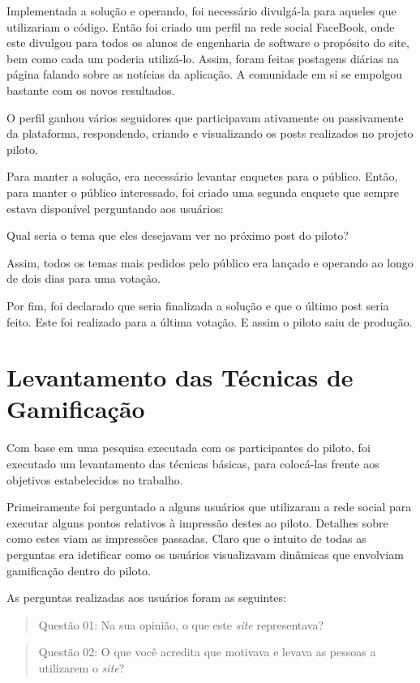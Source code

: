 Implementada a solução e operando, foi necessário divulgá-la para aqueles que utilizariam o código.
Então foi criado um perfil na rede social FaceBook, onde este divulgou para todos os alunos de engenharia
de software o propósito do site, bem como cada um poderia utilizá-lo. Assim, foram feitas postagens diárias
na página falando sobre as notícias da aplicação. A comunidade em si se empolgou bastante com os novos resultados.

O perfil ganhou vários seguidores que participavam ativamente ou passivamente da plataforma, respondendo, criando e
visualizando os posts realizados no projeto piloto.

Para manter a solução, era necessário levantar enquetes para o público. Então, para manter o público interessado,
foi criado uma segunda enquete que sempre estava disponível perguntando aos usuários:

Qual seria o tema que eles desejavam ver no próximo post do piloto?

Assim, todos os temas mais pedidos pelo público era lançado e operando ao longo de dois dias para uma votação.

Por fim, foi declarado que seria finalizada a solução e que o último post seria feito. Este foi realizado para a
última votação. E assim o piloto saiu de produção.

\section{Levantamento das Técnicas de Gamificação}
\label{sec:gamifição}
Com base em uma pesquisa executada com os participantes do piloto, foi executado um levantamento das
técnicas básicas, para colocá-las frente aos objetivos estabelecidos no trabalho.

Primeiramente foi perguntado a alguns usuários que utilizaram a rede social para executar alguns
pontos relativos à impressão destes ao piloto. Detalhes sobre como estes viam as impressões passadas.
Claro que o intuito de todas as perguntas era idetificar como os usuários visualizavam dinâmicas
que envolviam gamificação dentro do piloto.

As perguntas realizadas aos usuários foram as seguintes:

\begin{quotation}
    Questão 01: Na sua opinião, o que este \textit{site} representava?
\end{quotation}

\begin{quotation}
    Questão 02: O que você acredita que motivava e levava as pessoas a utilizarem o \textit{site}?
\end{quotation}

